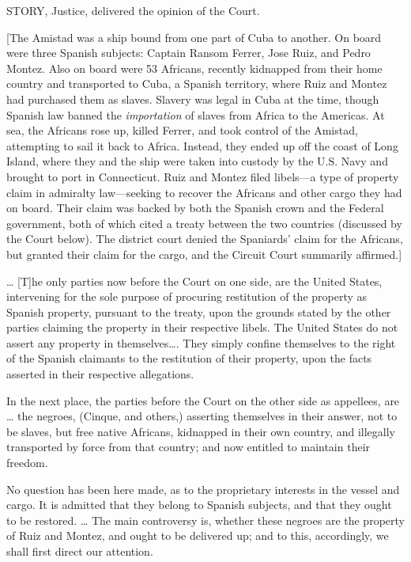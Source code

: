 
STORY, Justice, delivered the opinion of the Court.

[The Amistad was a ship bound from one part of Cuba to another. On board were
three Spanish subjects: Captain Ransom Ferrer, Jose Ruiz, and Pedro Montez.
Also on board were 53 Africans, recently kidnapped from their home country and
transported to Cuba, a Spanish territory, where Ruiz and Montez had purchased
them as slaves. Slavery was legal in Cuba at the time, though Spanish law
banned the \textit{importation} of slaves from Africa to the Americas. At sea,
the Africans rose up, killed Ferrer, and took control of the Amistad,
attempting to sail it back to Africa. Instead, they ended up off the coast of
Long Island, where they and the ship were taken into custody by the U.S. Navy
and brought to port in Connecticut. Ruiz and Montez filed libels---a type of
property claim in admiralty law---seeking to recover the Africans and other
cargo they had on board. Their claim was backed by both the Spanish crown and
the Federal government, both of which cited a treaty between the two countries
(discussed by the Court below). The district court denied the Spaniards' claim
for the Africans, but granted their claim for the cargo, and the Circuit Court
summarily affirmed.]

{\dots} [T]he only parties now before the Court on one side, are the United
States, intervening for the sole purpose of procuring restitution of the
property as Spanish property, pursuant to the treaty, upon the grounds stated
by the other parties claiming the property in their respective libels. The
United States do not assert any property in themselves{\dots}. They simply
confine themselves to the right of the Spanish claimants to the restitution of
their property, upon the facts asserted in their respective allegations.

In the next place, the parties before the Court on the other side as appellees,
are {\dots} the negroes, (Cinque, and others,) asserting themselves in their
answer, not to be slaves, but free native Africans, kidnapped in their own
country, and illegally transported by force from that country; and now entitled
to maintain their freedom.

No question has been here made, as to the proprietary interests in the vessel
and cargo. It is admitted that they belong to Spanish subjects, and that they
ought to be restored. {\dots} The main controversy is, whether these negroes
are the property of Ruiz and Montez, and ought to be delivered up; and to this,
accordingly, we shall first direct our attention.

